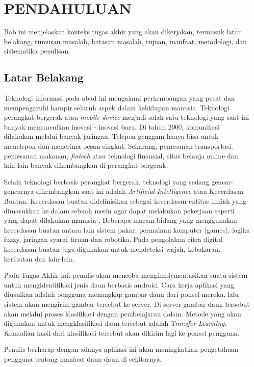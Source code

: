 \vspace{0ex}
\chapter {PENDAHULUAN}

Bab ini menjelaskan konteks tugas akhir yang akan dikerjakan, termasuk latar belakang, rumusan masalah, batasan masalah, tujuan, manfaat, metodologi, dan sistematika penulisan.

\section{Latar Belakang}
\par Teknologi informasi pada abad ini mengalami perkembangan yang pesat dan mempengaruhi hampir seluruh aspek dalam kehidupan manusia. Teknologi perangkat bergerak atau \textit{mobile device} menjadi salah satu teknologi yang saat ini banyak memunculkan inovasi - inovasi baru. Di tahun 2000, komunikasi dilakukan melalui banyak jaringan. Telepon genggam hanya bisa untuk menelepon dan menerima pesan singkat. Sekarang, pemesanan transportasi, pemesanan makanan, \textit{fintech} atau teknologi finansial, situs belanja online dan lain-lain banyak dikembangkan di perangkat bergerak.  

\par Selain teknologi berbasis perangkat bergerak, teknologi yang sedang gencar-gencarnya dikembangkan saat ini adalah \textit{Artificial Intelligence} atau Kecerdasan Buatan. Kecerdasan buatan didefinisikan sebagai kecerdasan entitas ilmiah yang dimasukkan ke dalam sebuah mesin agar dapat melakukan pekerjaan seperti yang dapat dilakukan manusia \cite{ai_def}. Beberapa macam bidang yang menggunakan kecerdasan buatan antara lain sistem pakar, permainan komputer (games), logika fuzzy, jaringan syaraf tiruan dan robotika. Pada pengolahan citra digital kecerdasan buatan juga digunakan untuk mendeteksi wajah, kebakaran, keributan dan lain-lain.
\par Pada Tugas Akhir ini, penulis akan mencoba mengimplementasikan suatu sistem untuk mengidentifikasi jenis daun berbasis android. Cara kerja aplikasi yang diusulkan adalah pengguna menangkap gambar daun dari ponsel mereka, lalu sistem akan mengirim gambar tersebut ke server. Di server gambar daun tersebut akan melalui proses klasifikasi dengan pembelajaran dalam. Metode yang akan digunakan untuk mengklasifikasi daun tersebut adalah \textit{Transfer Learning}. Kemudian hasil dari klasifikasi tersebut akan dikirim lagi ke ponsel pengguna. 
\par Penulis berharap dengan adanya aplikasi ini akan meningkatkan pengetahuan pengguna tentang manfaat daun-daun di sekitarnya.


